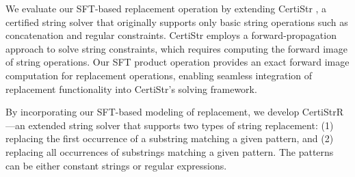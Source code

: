 



We evaluate our SFT-based replacement operation by extending CertiStr \cite{cpp/KanLRS22}, a certified string solver that originally supports only basic string operations such as concatenation and regular constraints. CertiStr employs a forward-propagation approach to solve string constraints, which requires computing the forward image of string operations. Our SFT product operation provides an exact forward image computation for replacement operations, enabling seamless integration of replacement functionality into CertiStr's solving framework.

By incorporating our SFT-based modeling of replacement, we develop CertiStrR—an extended string solver that supports two types of string replacement: (1) replacing the first occurrence of a substring matching a given pattern, and (2) replacing all occurrences of substrings matching a given pattern. The patterns can be either constant strings or regular expressions.






%
%

